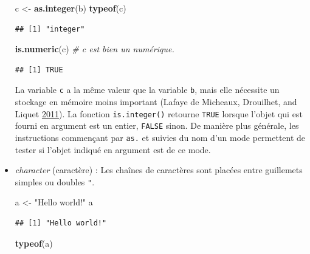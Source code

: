 \documentclass[
  11pt,
]{book}
\newenvironment{Shaded}{\begin{snugshade}}{\end{snugshade}}
\newcommand{\CommentTok}[1]{\textcolor[rgb]{0.56,0.35,0.01}{\textit{#1}}}
\newcommand{\KeywordTok}[1]{\textcolor[rgb]{0.13,0.29,0.53}{\textbf{#1}}}
\newcommand{\NormalTok}[1]{#1}
\newcommand{\StringTok}[1]{\textcolor[rgb]{0.31,0.60,0.02}{#1}}
\numberwithin{equation}{section}
\numberwithin{countremarque}{section}
\begin{document}
\begin{itemize}
\begin{Shaded}
\begin{Highlighting}[]
\NormalTok{c \textless{}{-}}\StringTok{ }\KeywordTok{as.integer}\NormalTok{(b)}
\KeywordTok{typeof}\NormalTok{(c)}
\end{Highlighting}
\end{Shaded}

\begin{lstlisting}
## [1] "integer"
\end{lstlisting}

\begin{Shaded}
\begin{Highlighting}[]
\KeywordTok{is.numeric}\NormalTok{(c) }\CommentTok{\# c est bien un numérique.}
\end{Highlighting}
\end{Shaded}

\begin{lstlisting}
## [1] TRUE
\end{lstlisting}

  La variable \texttt{c} a la même valeur que la variable \texttt{b}, mais elle nécessite un stockage en mémoire moins important (Lafaye de Micheaux, Drouilhet, and Liquet \protect\hyperlink{ref-Lafaye_2011_Logiciel}{2011}). La fonction \texttt{is.integer()} retourne \texttt{TRUE} lorsque l'objet qui est fourni en argument est un entier, \texttt{FALSE} sinon. De manière plus générale, les instructions commençant par \texttt{as.} et suivies du nom d'un mode permettent de tester si l'objet indiqué en argument est de ce mode.
\item
  \emph{character} (caractère) :
  Les chaînes de caractères sont placées entre guillemets simples \texttt{\textquotesingle{}} ou doubles \texttt{"}.

\begin{Shaded}
\begin{Highlighting}[]
\NormalTok{a \textless{}{-}}\StringTok{ "Hello world!"}
\NormalTok{a}
\end{Highlighting}
\end{Shaded}

\begin{lstlisting}
## [1] "Hello world!"
\end{lstlisting}

\begin{Shaded}
\begin{Highlighting}[]
\KeywordTok{typeof}\NormalTok{(a)}
\end{Highlighting}
\end{Shaded}


\end{itemize}
\end{document}
